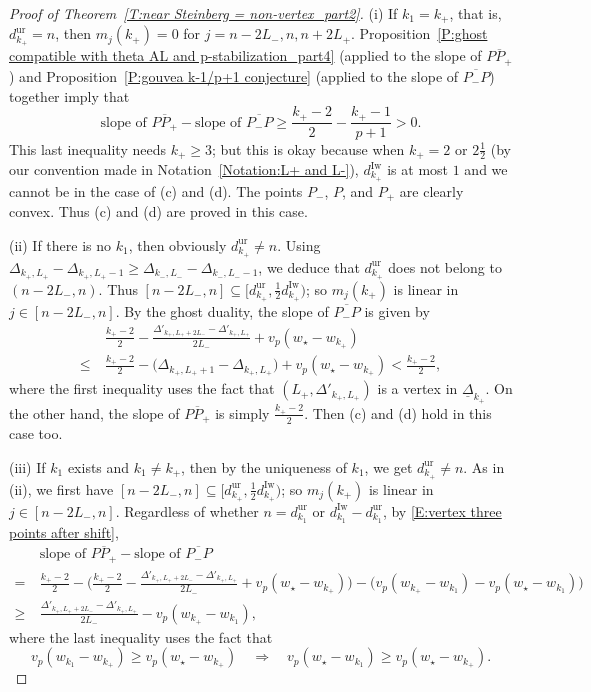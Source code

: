 \documentclass[12pt]{amsart}
\theoremstyle{definition}
\numberwithin{equation}{subsection}
\newcommand{\Iw}{\mathrm{Iw}}
\newcommand{\unr}{\mathrm{ur}}
\newcommand{\ur}{\mathrm{ur}}
\begin{document}
\begin{proof}[Proof of Theorem~\ref{T:near Steinberg = non-vertex_part2}]
(i)
If $k_1=k_+$, that is, $d_{k_+}^\unr = n$, then $m_j(k_+) = 0$ for $j = n-2L_-, n, n+2L_+$.
Proposition~\ref{P:ghost compatible with theta AL and p-stabilization_part4} (applied to the slope of $\overline{PP_+}$) and Proposition~\ref{P:gouvea k-1/p+1 conjecture} (applied to the slope of $\overline{P_-P}$) together imply that
\[
\textrm{slope of }\overline{PP_+}  - \textrm{slope of }\overline{P_-P} \geq \frac {k_+-2}{2} -  \frac{k_+-1}{p+1}>0.
\]
This last inequality needs $k_+ \geq 3$; but this is okay because when $k_+ = 2 $ or $ 2\frac 12$ (by our convention made in Notation~\ref{Notation:L+ and L-}), $d_{k_+}^\Iw$ is at most $1$ and we cannot be in the case of (c) and (d).
The points $P_-$, $P$, and $P_+$ are clearly convex. Thus (c) and (d) are proved in this case.

(ii) If there is no $k_1$, then obviously $d_{k_+}^\unr\neq n$. Using $\Delta_{k_+, L_+} - \Delta_{k_+, L_+-1} \geq \Delta_{k_-, L_-} - \Delta_{k_-, L_--1}$, we deduce that $d_{k_+}^\unr$ does not belong to $(n-2L_-, n)$. Thus $[n-2L_-, n]\subseteq [d_{k_+}^\unr, \tfrac 12 d_{k_+}^\Iw)$; so $m_j(k_+)$ is linear in $j \in [n-2L_-,n]$. By the ghost duality, the slope of $\overline{P_-P}$ is given by
\begin{align*}
&\frac{k_+-2}2  -\frac{ \Delta'_{k_+, L_++2L_-} - \Delta'_{k_+, L_+}}{2L_-} + v_p(w_\star- w_{k_+}) 
\\
\leq\ & \frac{k_+-2}2 - \big(\Delta_{k_+, L_++1}- \Delta_{k_+, L_+}\big) + v_p(w_\star - w_{k_+}) < \frac{k_+-2}2,
\end{align*}
where the first inequality uses the fact that $(L_+, \Delta'_{k_+, L_+})$ is a vertex in $\underline \Delta_{k_+}$. On the other hand, the slope of $\overline{PP_+}$ is simply $\frac{k_+-2}2$. Then (c) and (d) hold in this case too.

(iii) If $k_1$ exists and $k_1 \neq k_+$, then by the uniqueness of $k_1$, we get $d_{k_+}^\unr\neq n$. As in (ii), we first have $[n-2L_-, n]\subseteq [d_{k_+}^\unr, \tfrac 12 d_{k_+}^\Iw)$; so $m_j(k_+)$ is linear in $j \in [n-2L_-,n]$. 
Regardless of whether  $n=d_{k_1}^{\unr}$ or $d_{k_1}^\Iw-d_{k_1}^\ur$,  by \eqref{E:vertex three points after shift},
\begin{align*}
&\textrm{slope of }\overline{PP_+}  - \textrm{slope of }\overline{P_-P}
\\
=\ & \frac{k_+-2}2 - \Big( \frac{k_+-2}2  -\frac{\Delta'_{k_+, L_++2L_-} - \Delta'_{k_+, L_+}}{2L_-} +v_p(w_\star-w_{k_+})\Big) - \big(v_p(w_{k_+}-w_{k_1})- v_p(w_\star-w_{k_1})  \big)
\\
\geq \ &\frac{\Delta'_{k_+, L_++2L_-} - \Delta'_{k_+, L_+}}{2L_-} - v_p(w_{k_+}-w_{k_1}),
\end{align*}
where the last inequality uses the fact that $$v_p(w_{k_1} - w_{k_+}) \geq  v_p(w_\star-w_{k_+})\quad \Rightarrow \quad v_p(w_\star - w_{k_1}) \geq  v_p(w_\star-w_{k_+}).$$


\end{proof}
\end{document}
